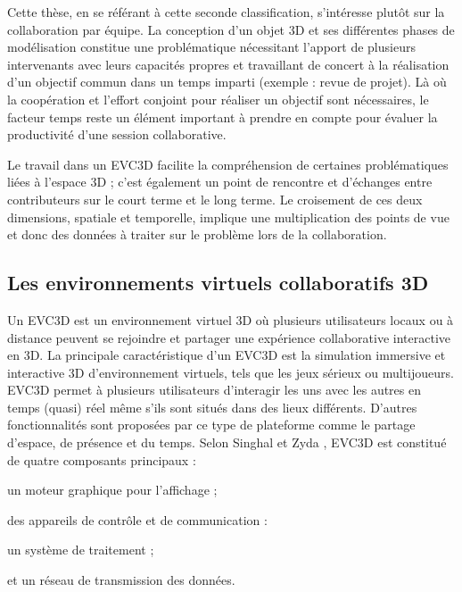 Cette thèse, en se référant à cette seconde classification, s'intéresse plutôt 
sur la collaboration par équipe. La conception d'un objet 3D et ses différentes 
phases de modélisation constitue une problématique nécessitant l'apport de 
plusieurs intervenants avec leurs capacités propres et travaillant de concert à la 
réalisation d'un objectif commun dans un temps imparti (exemple : revue de 
projet). Là où la coopération et l'effort conjoint pour réaliser un objectif sont 
nécessaires, le facteur temps reste un élément important à prendre en compte 
pour évaluer la productivité d'une session collaborative.

Le travail dans un \gls{EVC3D} facilite la compréhension 
de certaines problématiques liées à l'espace 3D ; c'est également un point de 
rencontre et d'échanges entre contributeurs sur le court terme et le long terme. 
Le croisement de ces deux dimensions, spatiale et temporelle, implique une 
multiplication des points de vue et donc des données à traiter sur le problème lors 
de la collaboration.

 
\subsection{Les environnements virtuels collaboratifs 3D}

Un \gls{EVC3D} est un environnement virtuel 3D où plusieurs utilisateurs locaux 
ou à distance peuvent se rejoindre et partager une expérience collaborative 
interactive en 3D. La principale caractéristique d'un \gls{EVC3D} est la simulation 
immersive et interactive 3D d'environnement virtuels, tels que les jeux sérieux ou 
multijoueurs. \gls{EVC3D} permet à plusieurs utilisateurs d'interagir les uns avec 
les autres en temps (quasi) réel même s'ils sont situés dans des lieux différents. 
D'autres fonctionnalités sont proposées par ce type de plateforme comme le 
partage d'espace, de présence et du temps. Selon Singhal et Zyda 
\cite{Singhal1999}, \gls{EVC3D} est constitué de quatre composants principaux :
\begin{enumerate*}[label=(\roman*)]
	\item un moteur graphique pour l'affichage ;
	\item des appareils de contrôle et de communication :
	\item un système de traitement ;
	\item et un réseau de transmission des données. 
\end{enumerate*}

